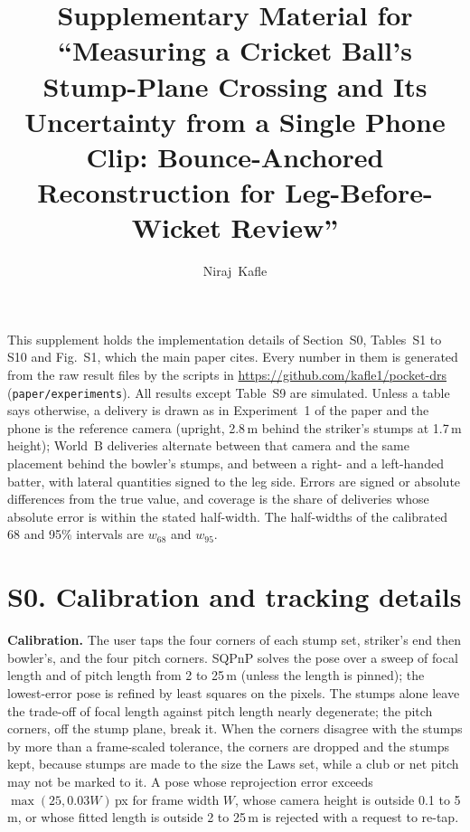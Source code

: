 \documentclass[journal]{IEEEtran}
\begin{document}
\title{Supplementary Material for ``Measuring a Cricket Ball's Stump-Plane Crossing and Its Uncertainty from
a Single Phone Clip: Bounce-Anchored Reconstruction for Leg-Before-Wicket Review''}
\author{Niraj~Kafle}
\maketitle

This supplement holds the implementation details of Section~S0, Tables~S1 to S10 and Fig.~S1, which the
main paper cites. Every number in them is
generated from the raw result files by the scripts in \url{https://github.com/kafle1/pocket-drs}
(\texttt{paper/experiments}). All results except Table~S9 are simulated. Unless a table says otherwise, a
delivery is drawn as in Experiment~1 of the paper and the phone is the reference camera (upright, 2.8\,m
behind the striker's stumps at 1.7\,m height); World~B deliveries alternate between that camera and the
same placement behind the bowler's stumps, and between a right- and a left-handed batter, with lateral
quantities signed to the leg side. Errors are signed or absolute differences from the true value, and
coverage is the share of deliveries whose absolute error is within the stated half-width. The half-widths of
the calibrated 68 and 95\% intervals are $w_{68}$ and $w_{95}$.

\section*{S0. Calibration and tracking details}

\textbf{Calibration.} The user taps the four corners of each stump set, striker's end then bowler's, and
the four pitch corners. SQPnP solves the pose over a sweep of focal length and of pitch
length from 2 to 25\,m (unless the length is pinned); the lowest-error pose is refined by least squares on the pixels. The stumps alone
leave the trade-off of focal length against pitch length nearly degenerate; the pitch corners, off the stump
plane, break it. When the corners disagree with the stumps by more than a frame-scaled tolerance, the
corners are dropped and the stumps kept, because stumps are made to the size the Laws set, while a club or net pitch may not be marked to it. A pose whose reprojection
error exceeds $\max(25, 0.03W)$\,px for frame width $W$, whose camera height is outside 0.1 to 5\,m, or whose
fitted length is outside 2 to 25\,m is rejected with a request to re-tap.
\end{document}
